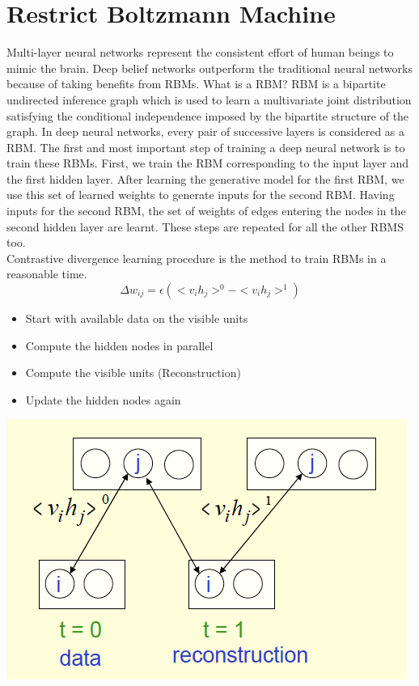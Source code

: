 \documentclass{article} %
\begin{document}
\section{Restrict Boltzmann Machine}
Multi-layer neural networks represent the consistent effort of human beings to mimic the brain. 
Deep belief networks outperform the traditional neural networks  because of taking benefits from RBMs. 
What is a RBM? 
RBM is a bipartite undirected inference graph which is used to learn a multivariate joint distribution satisfying the conditional independence imposed by the bipartite structure of the graph. 
In deep neural networks, every pair of successive layers is considered as a RBM. 
The first and most important step of training a deep neural network is to train these RBMs.
First, we train the RBM corresponding to the input layer and the first hidden layer. 
After learning the generative model for the first RBM, we use this set of learned weights to generate inputs for the second RBM. 
Having inputs for the second RBM, the set of weights of edges entering the nodes in the second hidden layer are learnt. 
These steps are repeated for all the other RBMS too.\\
\indent Contrastive divergence learning procedure is the method to train RBMs in a reasonable time. 
\[ \Delta w_{ij} = \epsilon (<v_{i}h_{j}>^{0} - <v_{i}h_{j}>^{1}) \]
\begin{itemize}
\item Start with available data on the visible units
\item Compute the hidden nodes in parallel
\item Compute the visible units (Reconstruction)
\item Update the hidden nodes again
\end{itemize}

\begin{center}
\includegraphics[width=0.6\linewidth]{CDLP.png}
\end{center}
\end{document}
